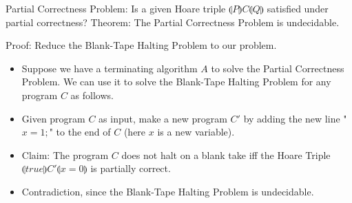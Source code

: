 \documentclass{article}
\begin{document}
Partial Correctness Problem: Is a given Hoare triple $\llparenthesis P \rrparenthesis C \llparenthesis Q \rrparenthesis$ satisfied under partial correctness?
Theorem: The Partial Correctness Problem is undecidable.

Proof: Reduce the Blank-Tape Halting Problem to our problem.
\begin{itemize}
    \item Suppose we have a terminating algorithm $A$ to solve the Partial Correctness Problem. We can use it to solve the Blank-Tape Halting Problem for any program $C$ as follows.
    \item Given program $C$ as input, make a new program $C'$ by adding the new line "$x =1;$" to the end of $C$ (here $x$ is a new variable).
    \item Claim: The program $C$ does not halt on a blank take iff the Hoare Triple $\llparenthesis true \rrparenthesis C' \llparenthesis x = 0 \rrparenthesis$ is partially correct.
    \item Contradiction, since the Blank-Tape Halting Problem is undecidable.
\end{itemize}
\end{document}
